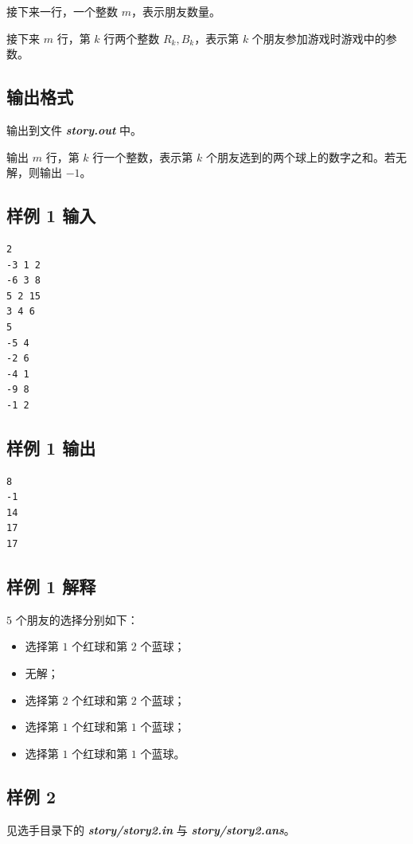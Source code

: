 \documentclass[12pt]{article}                               %
\newcommand{\filename}[1]{{\textbf{\textit{#1}}}}           %
\begin{document}
	接下来一行，一个整数 $m$，表示朋友数量。

	接下来 $m$ 行，第 $k$ 行两个整数 $R_k,B_k$，表示第 $k$ 个朋友参加游戏时游戏中的参数。

	\subsection{输出格式}

	输出到文件 \filename{story.out} 中。

  输出 $m$ 行，第 $k$ 行一个整数，表示第 $k$ 个朋友选到的两个球上的数字之和。若无解，则输出 $-1$。

	\subsection{样例 1 输入}

\begin{lstlisting}
2
-3 1 2
-6 3 8
5 2 15
3 4 6
5
-5 4
-2 6
-4 1
-9 8
-1 2
\end{lstlisting}

	\subsection{样例 1 输出}

\begin{lstlisting}
8
-1
14
17
17
\end{lstlisting}

	\subsection{样例 1 解释}

	$5$ 个朋友的选择分别如下：

	\begin{itemize}
		\item 选择第 $1$ 个红球和第 $2$ 个蓝球；
		\item 无解；
		\item 选择第 $2$ 个红球和第 $2$ 个蓝球；
		\item 选择第 $1$ 个红球和第 $1$ 个蓝球；
		\item 选择第 $1$ 个红球和第 $1$ 个蓝球。
	\end{itemize}

	\subsection{样例 2}

	见选手目录下的 \filename{story/story2.in} 与 \filename{story/story2.ans}。
\end{document}
